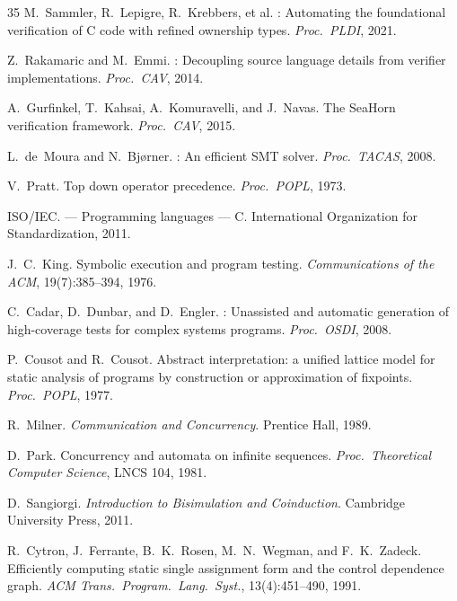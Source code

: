 \documentclass[11pt,a4paper]{article}
\begin{document}
\begin{thebibliography}{35}
M.~Sammler, R.~Lepigre, R.~Krebbers, et al.
: Automating the foundational verification of {C} code with refined ownership types.
\newblock \emph{Proc.\ PLDI}, 2021.

Z.~Rakamaric and M.~Emmi.
: Decoupling source language details from verifier implementations.
\newblock \emph{Proc.\ CAV}, 2014.

A.~Gurfinkel, T.~Kahsai, A.~Komuravelli, and J.~Navas.
\newblock The {SeaHorn} verification framework.
\newblock \emph{Proc.\ CAV}, 2015.

L.~de~Moura and N.~Bj{\o}rner.
: An efficient {SMT} solver.
\newblock \emph{Proc.\ TACAS}, 2008.

V.~Pratt.
\newblock Top down operator precedence.
\newblock \emph{Proc.\ POPL}, 1973.

{ISO/IEC}.
 --- {P}rogramming languages --- {C}.
\newblock International Organization for Standardization, 2011.

J.~C.~King.
\newblock Symbolic execution and program testing.
\newblock \emph{Communications of the ACM}, 19(7):385--394, 1976.

C.~Cadar, D.~Dunbar, and D.~Engler.
: Unassisted and automatic generation of high-coverage tests for complex systems programs.
\newblock \emph{Proc.\ OSDI}, 2008.

P.~Cousot and R.~Cousot.
\newblock Abstract interpretation: a unified lattice model for static analysis of programs by construction or approximation of fixpoints.
\newblock \emph{Proc.\ POPL}, 1977.

R.~Milner.
\newblock \emph{Communication and Concurrency}.
\newblock Prentice Hall, 1989.

D.~Park.
\newblock Concurrency and automata on infinite sequences.
\newblock \emph{Proc.\ Theoretical Computer Science}, LNCS 104, 1981.

D.~Sangiorgi.
\newblock \emph{Introduction to Bisimulation and Coinduction}.
\newblock Cambridge University Press, 2011.

R.~Cytron, J.~Ferrante, B.~K.~Rosen, M.~N.~Wegman, and F.~K.~Zadeck.
\newblock Efficiently computing static single assignment form and the control dependence graph.
\newblock \emph{ACM Trans.\ Program.\ Lang.\ Syst.}, 13(4):451--490, 1991.


\end{thebibliography}
\end{document}

